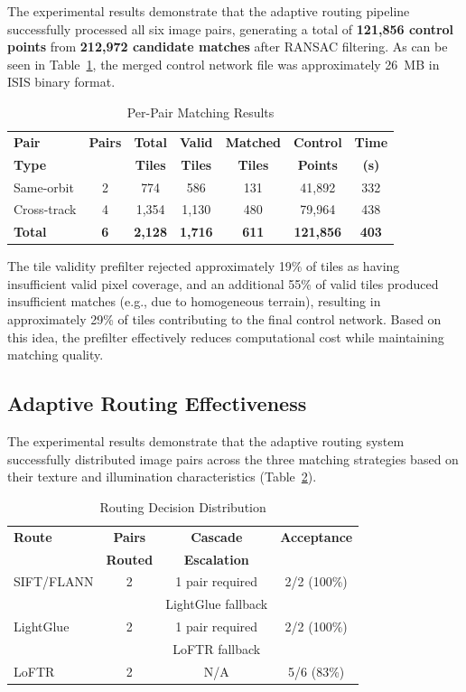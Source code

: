 \documentclass[lettersize,journal]{IEEEtran}
\begin{document}
The experimental results demonstrate that the adaptive routing pipeline successfully processed all six image pairs, generating a total of \textbf{121,856 control points} from \textbf{212,972 candidate matches} after RANSAC filtering. As can be seen in Table~\ref{tab:results}, the merged control network file was approximately 26~MB in ISIS binary format.

\begin{table}[htbp]
\caption{Per-Pair Matching Results}
\label{tab:results}
\centering
\begin{tabular}{@{}lcccccc@{}}
\toprule
\textbf{Pair} & \textbf{Pairs} & \textbf{Total} & \textbf{Valid} & \textbf{Matched} & \textbf{Control} & \textbf{Time} \\
\textbf{Type} &  & \textbf{Tiles} & \textbf{Tiles} & \textbf{Tiles} & \textbf{Points} & \textbf{(s)} \\
\midrule
Same-orbit & 2 & 774 & 586 & 131 & 41,892 & 332 \\
Cross-track & 4 & 1,354 & 1,130 & 480 & 79,964 & 438 \\
\textbf{Total} & \textbf{6} & \textbf{2,128} & \textbf{1,716} & \textbf{611} & \textbf{121,856} & \textbf{403} \\
\bottomrule
\end{tabular}
\end{table}

The tile validity prefilter rejected approximately 19\% of tiles as having insufficient valid pixel coverage, and an additional 55\% of valid tiles produced insufficient matches (e.g., due to homogeneous terrain), resulting in approximately 29\% of tiles contributing to the final control network. Based on this idea, the prefilter effectively reduces computational cost while maintaining matching quality.

\subsection{Adaptive Routing Effectiveness}

The experimental results demonstrate that the adaptive routing system successfully distributed image pairs across the three matching strategies based on their texture and illumination characteristics (Table~\ref{tab:routing_dist}).

\begin{table}[htbp]
\caption{Routing Decision Distribution}
\label{tab:routing_dist}
\centering
\begin{tabular}{@{}lccc@{}}
\toprule
\textbf{Route} & \textbf{Pairs} & \textbf{Cascade} & \textbf{Acceptance} \\
 & \textbf{Routed} & \textbf{Escalation} &  \\
\midrule
SIFT/FLANN & 2 & 1 pair required & 2/2 (100\%) \\
 &  & LightGlue fallback &  \\
LightGlue & 2 & 1 pair required & 2/2 (100\%) \\
 &  & LoFTR fallback &  \\
LoFTR & 2 & N/A & 5/6 (83\%) \\
\bottomrule
\end{tabular}
\end{table}
\end{document}
